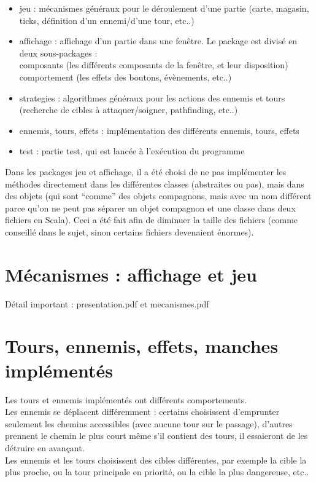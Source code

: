 \documentclass{article}
\begin{document}
\begin{itemize}
\item
  jeu : mécanismes généraux pour le déroulement d'une partie (carte, magasin, ticks, définition d'un ennemi/d'une tour, etc..)
\item
  affichage : affichage d'un partie dans une fenêtre. Le package est divisé en deux sous-packages : \\
  composants (les différents composants de la fenêtre, et leur disposition) \\
  comportement (les effets des boutons, évènements, etc..)
\item
  strategies : algorithmes généraux pour les actions des ennemis et tours (recherche de cibles à attaquer/soigner, pathfinding, etc..)
\item
  ennemis, tours, effets : implémentation des différents ennemis, tours, effets
\item
  test : partie test, qui est lancée à l'exécution du programme
\end{itemize}

Dans les packages jeu et affichage, il a été choisi de ne pas implémenter les méthodes directement dans les différentes classes (abstraites ou pas), mais dans des objets (qui sont ``comme'' des objets compagnons, mais avec un nom différent parce qu'on ne peut pas séparer un objet compagnon et une classe dans deux fichiers en Scala).
Ceci a été fait afin de diminuer la taille des fichiers (comme conseillé dans le sujet, sinon certains fichiers devenaient énormes).


\section{Mécanismes : affichage et jeu}

Détail important : presentation.pdf et mecanismes.pdf

\section{Tours, ennemis, effets, manches implémentés}

Les tours et ennemis implémentés ont différents comportements. \\
Les ennemis se déplacent différemment : certains choisissent d'emprunter seulement les chemins accessibles (avec aucune tour sur le passage), d'autres prennent le chemin le plus court même s'il contient des tours, il essaieront de les détruire en avançant. \\
Les ennemis et les tours choisissent des cibles différentes, par exemple la cible la plus proche, ou la tour principale en priorité, ou la cible la plus dangereuse, etc..
\end{document}
